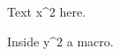 \documentclass{article}
\newcommand\sq[1]{#1^2}
\begin{document}
Text x^2 here.

Inside \sq{y} a macro.
\end{document}
